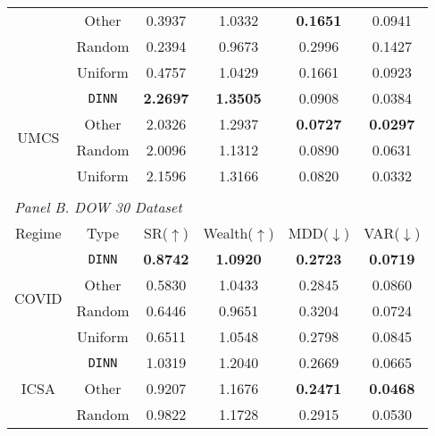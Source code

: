 {\begin{tabular}{cccccc}
                       & Other       & 0.3937          & 1.0332             & \textbf{0.1651}   & 0.0941            \\
                       & Random      & 0.2394          & 0.9673             & 0.2996            & 0.1427            \\
                       & Uniform     & 0.4757          & 1.0429             & 0.1661            & 0.0923            \\ \hline
\multirow{4}{*}{UMCS}  & \texttt{DINN} & \textbf{2.2697} & \textbf{1.3505}    & 0.0908            & 0.0384            \\
                       & Other       & 2.0326          & 1.2937             & \textbf{0.0727}   & \textbf{0.0297}   \\
                       & Random      & 2.0096          & 1.1312             & 0.0890            & 0.0631            \\
                       & Uniform     & 2.1596          & 1.3166             & 0.0820            & 0.0332            \\ \hline
\multicolumn{6}{l}{}                                                                                                \\ \hline
\multicolumn{6}{l}{\textit{Panel B. DOW 30 Dataset}}                                                                \\
Regime                 & Type        & SR($\uparrow$)  & Wealth($\uparrow$) & MDD($\downarrow$) & VAR($\downarrow$) \\ \hline
\multirow{4}{*}{COVID} & \texttt{DINN} & \textbf{0.8742} & \textbf{1.0920}    & \textbf{0.2723}   & \textbf{0.0719}   \\
                       & Other       & 0.5830          & 1.0433             & 0.2845            & 0.0860            \\
                       & Random      & 0.6446          & 0.9651             & 0.3204            & 0.0724            \\
                       & Uniform     & 0.6511          & 1.0548             & 0.2798            & 0.0845            \\ \hline
\multirow{4}{*}{ICSA}  & \texttt{DINN} & 1.0319          & 1.2040             & 0.2669            & 0.0665            \\
                       & Other       & 0.9207          & 1.1676             & \textbf{0.2471}   & \textbf{0.0468}   \\
                       & Random      & 0.9822          & 1.1728             & 0.2915            & 0.0530            \\

\end{tabular}}
